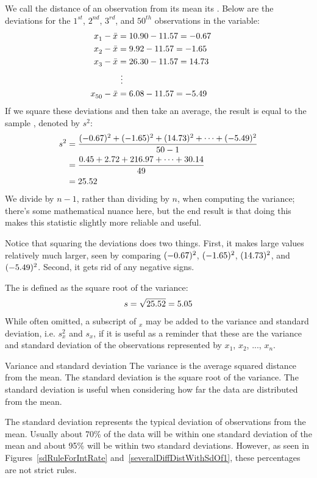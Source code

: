 We call the distance of an observation from its mean its . Below are the deviations for the $1^{st}_{}$, $2^{nd}_{}$, $3^{rd}$, and $50^{th}_{}$ observations in the  variable:
\begin{align*}
x_1^{}-\bar{x} &= 10.90 - 11.57{} = -0.67 \hspace{5mm}\text{ } \\
x_2^{}-\bar{x} &= 9.92 - 11.57{} = -1.65 \\
x_3^{}-\bar{x} &= 26.30 - 11.57{} = 14.73 \\
			&\ \vdots \\
x_{50}^{}-\bar{x} &= 6.08 - 11.57{} = -5.49
\end{align*}
If we square these deviations and then take an average,
the result is equal to the sample
\label{varianceIsDefined},
denoted by $s_{}^2$:
\begin{align*}
s_{}^2 &= \frac{(-0.67)_{}^2 + (-1.65)_{}^2 + (14.73)_{}^2 + \cdots + (-5.49)_{}^2}{50{}-1} \\
	&= \frac{0.45 + 2.72 + 216.97 + \cdots + 30.14}{49} \\
	&= 25.52{}
\end{align*}
We divide by $n - 1$, rather than dividing by $n$,
when computing the variance;
there's some mathematical nuance here, but the end result is that
doing this makes this statistic slightly more reliable and useful.

Notice that squaring the deviations does two things.
First, it makes large values relatively much larger,
seen by comparing $(-0.67)^2$, $(-1.65)^2$, $(14.73)^2$,
and $(-5.49)^2$.
Second, it gets rid of any negative signs.

The  is defined as the square root of the variance:
\begin{align*}
s = \sqrt{25.52{}} = 5.05{}
\end{align*}
While often omitted, a subscript of $_x$ may be added
to the variance and standard deviation,
i.e. $s_x^2$ and $s_x^{}$, if it is useful as a reminder
that these are the variance and standard deviation of the
observations represented by $x_1^{}$, $x_2^{}$, ..., $x_n^{}$.

\begin{onebox}{Variance and standard deviation}
  The variance is the average squared distance from the mean.
  The standard deviation is the square root of the variance.
  The standard deviation is useful when considering how far
  the data are distributed from the mean.\vspace{3mm}

  The standard deviation represents the typical deviation
  of observations from the mean.
  Usually about 70\% of the data will be within one standard
  deviation of the mean and about 95\% will be within two
  standard deviations.
  However, as seen in Figures~\ref{sdRuleForIntRate}
  and~\ref{severalDiffDistWithSdOf1}, these percentages are
  not strict rules.
\end{onebox}

